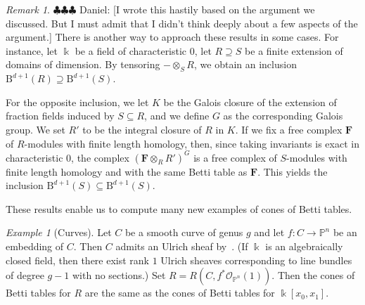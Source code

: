 \documentclass[12pt]{amsart}
\theoremstyle{definition}
\theoremstyle{remark}
\newtheorem{example}[lemma]{Example}
\newtheorem{remark}[lemma]{Remark}
\newcommand{\kk}{\Bbbk}
\newcommand{\PP}{\mathbb{P}}
\newcommand{\cO}{\mathcal{O}}
\newcommand{\FF}{\mathbf{F}}
\newcommand{\BBQ}{\mathrm{B}}
\newcommand{\daniel}[1]{{\color{green} \sf $\clubsuit\clubsuit\clubsuit$ Daniel: [#1]}}
\begin{document}
\begin{remark}\daniel{I wrote this hastily based on the argument we discussed.  But I must admit that I didn't think deeply about a few aspects of the argument.}
There is another way to approach these results in some cases.  For instance, let $\kk$ be a field of characteristic $0$, let $R\supseteq S$ be a finite extension of domains of dimension.  By tensoring $-\otimes_S R$, we obtain an inclusion $\BBQ^{d+1}(R)\supseteq \BBQ^{d+1}(S)$.  

For the opposite inclusion, we let $K$ be the Galois closure of the extension of fraction fields induced by $S\subseteq R$, and we define $G$ as the corresponding Galois group.  We set $R'$ to be the integral closure of $R$ in $K$.  If we fix a free complex $\FF$ of $R$-modules with finite length homology, then, since taking invariants is exact in characteristic $0$, the complex $(\FF\otimes_R R')^G$ is a free complex of $S$-modules with finite length homology and with the same Betti table as $\FF$.  This yields the inclusion $\BBQ^{d+1}(S)\subseteq \BBQ^{d+1}(S)$.
\end{remark}
These results enable us to compute many new examples of cones of Betti tables.

\begin{example}[Curves]\label{ex:res over section ring of ell curve}
Let $C$ be a smooth curve of genus $g$ and let $f\colon C\to \PP^n$ be an embedding of $C$.  Then $C$ admits an Ulrich sheaf by~\cite[Corollary~4.5]{eis-schrey-chow}.  (If $\kk$ is an algebraically closed field, then there exist rank $1$ Ulrich sheaves corresponding to line bundles of degree $g-1$ with no sections.)  Set $R=R(C,f^*\cO_{\PP^n}(1))$.  Then the cones of Betti tables for $R$ are the same as the cones of Betti tables for $\kk[x_0,x_1]$.
%
%
%
\end{example}
\end{document}
